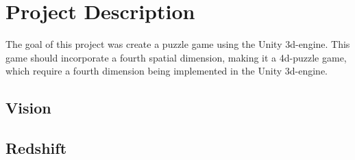 \section{Project Description}
The goal of this project was create a puzzle game using the Unity 3d-engine. This game should incorporate a fourth spatial dimension, making it a 4d-puzzle game, which require a fourth dimension being implemented in the Unity 3d-engine.
\subsection{Vision}

\subsection{Redshift}
